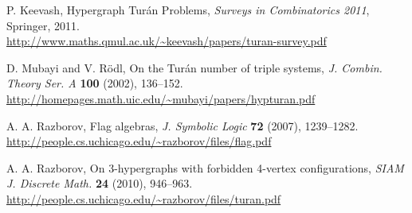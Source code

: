 \documentclass{article}
\begin{document}
\begin{thebibliography}{10}
 P. Keevash, Hypergraph Turán Problems, \emph{Surveys in Combinatorics 2011}, Springer, 2011. \\
\url{http://www.maths.qmul.ac.uk/~keevash/papers/turan-survey.pdf}

 D. Mubayi and V. R\"odl, On the Tur\'an number of triple systems, \emph{J. Combin. Theory Ser. A} \textbf{100} (2002), 136--152. \\
\url{http://homepages.math.uic.edu/~mubayi/papers/hypturan.pdf}

 A. A. Razborov, Flag algebras, \emph{J. Symbolic Logic} \textbf{72} (2007), 1239--1282. \\ %
\url{http://people.cs.uchicago.edu/~razborov/files/flag.pdf}

 A. A. Razborov, On 3-hypergraphs with forbidden 4-vertex configurations, \emph{SIAM J. Discrete Math.} \textbf{24} (2010), 946--963. \\ %
\url{http://people.cs.uchicago.edu/~razborov/files/turan.pdf}

\end{thebibliography}
\end{document}
